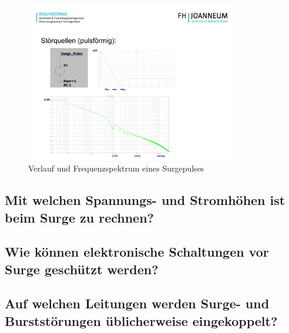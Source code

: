 \begin{figure}[ht]
  \centering
  \includegraphics[height=7cm]{src/assets/pictures/lv4_surge_pulse.jpg}
  \caption{Verlauf und Frequenzspektrum eines Surgepulses}\label{fig:lv4:surge_puls}
\end{figure}

\subsection{Mit welchen Spannungs- und Stromhöhen ist beim Surge zu rechnen?}

\subsection{Wie können elektronische Schaltungen vor Surge geschützt werden?}


\subsection{Auf welchen Leitungen werden Surge- und Burststörungen üblicherweise eingekoppelt?}

\pagebreak
